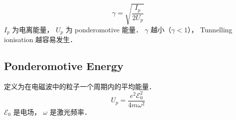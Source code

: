 
\begin{equation}
\gamma = \sqrt{\frac{I_p}{2U_p}}
\end{equation}
$I_p$ 为电离能量， $U_p$ 为 ponderomotive 能量． $\gamma$ 越小（$\gamma < 1$）， Tunnelling ionisation 越容易发生．

\subsection{Ponderomotive Energy}
定义为在电磁波中的粒子一个周期内的平均能量．
\begin{equation}
U_p = \frac{e^2 \mathcal E_0^2}{4m\omega^2}
\end{equation}
$\mathcal E_0$ 是电场， $\omega$ 是激光频率．
